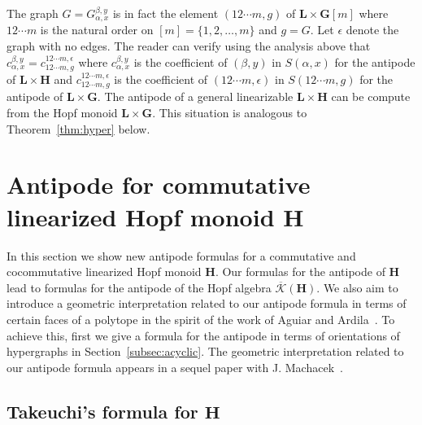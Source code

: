 \documentclass[ALCO,ThmDefs,Unicode,epreuves]{cedram}
\newcommand{\bL}{\mathbf{L}}
\newcommand{\bH}{\mathbf{H}}
\newcommand{\bG}{\mathbf{G}}
\newcommand{\Kc}{\mathcal{K}}
\newcommand{\Kcb}{\overline{\Kc}}
\begin{document}
\begin{rema}\label{rem:lineargaph} 
 The graph $G=G_{\alpha,x}^{\beta,y}$ is in fact the element $(12\cdots m,g)$ of $\bL\times\bG[m]$ where $12\cdots m$ is the natural order on $[m]=\{1,2,\ldots, m\}$ and $g=G$. Let $\epsilon$ denote the graph with no edges.
 The reader can verify using the analysis above that $c_{\alpha,x}^{\beta,y} = c_{12\cdots m,g}^{12\cdots m, \epsilon}$
 where $c_{\alpha,x}^{\beta,y}$ is the coefficient of $(\beta,y)$ in $S(\alpha,x)$ for the antipode of $\bL\times\bH$ and 
 $c_{12\cdots m,g}^{12\cdots m, \epsilon}$ is the coefficient of $(12\cdots m, \epsilon)$ in $S(12\cdots m,g)$ for the antipode of 
 $\bL\times\bG$. The antipode of a general linearizable $\bL\times\bH$ can be compute from the Hopf monoid $\bL\times\bG$.
 This situation is analogous to Theorem~\ref{thm:hyper} below. 
\end{rema}

\section{Antipode for commutative linearized Hopf monoid \texorpdfstring{$\mathbf{H}$}{H}}\label{s:antiH}

In this section we show new antipode formulas for a commutative and cocommutative linearized Hopf monoid $\bH$. 
Our formulas for the antipode of $\bH$ lead to formulas for the antipode of the Hopf algebra $\Kcb(\bH)$. We also aim to introduce a geometric interpretation related to our antipode formula in terms of certain faces of a polytope in the spirit of the work of Aguiar and Ardila~\cite{Aguiar-Ardila}.
To achieve this, first we give a formula for the antipode in terms of orientations of hypergraphs in Section~\ref{subsec:acyclic}.
The geometric interpretation related to our antipode formula appears in a sequel paper with J. Machacek~\cite{BBM:2017}.

\subsection{Takeuchi's formula for \texorpdfstring{$\mathbf{H}$}{H}}\label{ss:UsingTakeushiH}
\end{document}
